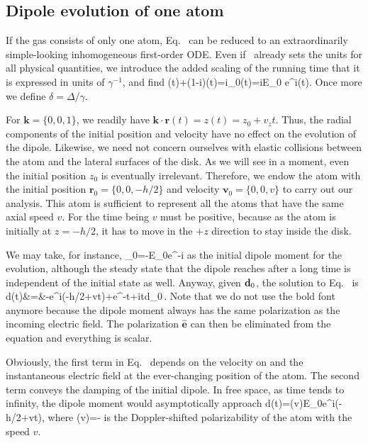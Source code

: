 \subsection{Dipole evolution of one atom}
\label{ONEATOMDIPOLE}
If the gas consists of only one atom, Eq.~ can be reduced to an extraordinarily simple-looking inhomogeneous first-order ODE. Even if~ already sets the units for all physical quantities, we introduce the added scaling of the running time that it is expressed in units of $\gamma^{-1}$, and find
\bea
{}(t)+(1-i\delta)(t)=i_0(t)=iE_0\,\,e^{i\cdot{}(t)}.
\label{SINGLEEQ}
\eea
Once more we define $\delta=\Delta/\gamma$. 

For $\mathbf{k}=\{0,0,1\}$, we readily have $\mathbf{k}\cdot\mathbf{r}(t)=z(t)=z_0+v_zt$. Thus, the radial components of the initial position and velocity have no effect on the evolution of the dipole. Likewise, we need not concern ourselves with elastic collisions between the atom and the lateral surfaces of the disk. As we will see in a moment, even the initial position $z_0$ is eventually irrelevant. Therefore, we endow the atom with the initial position $\mathbf{r}_0=\{0,0,-h/2\}$ and velocity $\mathbf{v}_0=\{0,0,v\}$ to carry out our analysis. This atom is sufficient to represent all the atoms that have the same axial speed $v$. For the time being $v$ must be positive, because as the atom is initially at $z=-h/2$, it has to move in the $+z$ direction to stay inside the disk.

We may take, for instance, 
\beq
{}_0=-E_0e^{-i}
\eeq
 as the initial dipole moment for the evolution, although the steady state that the dipole reaches after a long time is independent of the initial state as well. Anyway, given ${\bf d}_0$, the solution to Eq.~ is
\bea
d(t)&=&-e^{i(-h/2+vt)}+e^{-t+i\delta t}d_0\,.
\label{SINGLESOL}
\eea
Note that we do not use the bold font anymore because the dipole moment always has the same polarization as the incoming electric field. The polarization $\hat{\mathbf{e}}$ can then be eliminated from the equation and everything is scalar.

Obviously, the first term in Eq.~ depends on the velocity on and the instantaneous electric field at the ever-changing position of the atom. The second term conveys the damping of the initial dipole. In free space, as time tends to infinity, the dipole moment would asymptotically approach
\bea
d(t\to\infty)=\alpha(v)E_0e^{i(-h/2+vt)},
\eea
where
\beq
\alpha(v)=-
\eeq
 is the Doppler-shifted polarizability of the atom with the speed $v$.

